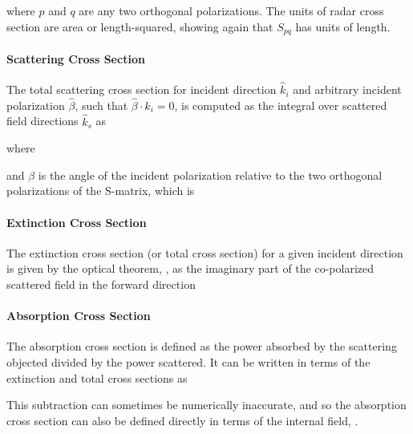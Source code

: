 \noindent where $p$ and $q$ are any two orthogonal polarizations. The units of radar cross section are area or length-squared, showing again that $S_{pq}$ has units of length.

\paragraph{Scattering Cross Section} The total scattering cross section for incident direction $\hat{k}_i$ and arbitrary incident polarization $\hat{\beta}$, such that $\hat{\beta} \cdot \hat{k}_i = 0$, is computed as the integral over scattered field directions $\hat{k}_s$ as

\noindent where

\noindent and $\beta$ is the angle of the incident polarization relative to the two orthogonal polarizations of the S-matrix, which is 

\paragraph{Extinction Cross Section} The extinction cross section (or total cross section) for a given incident direction is given by the optical theorem, \cite{zhang2019generalized}, as the imaginary part of the co-polarized scattered field in the forward direction

\paragraph{Absorption Cross Section} The absorption cross section is defined as the power absorbed by the scattering objected divided by the power scattered. It can be written in terms of the extinction and total cross sections as 

This subtraction can sometimes be numerically inaccurate, and so the absorption cross section can also be defined directly in terms of the internal field, \cite{yurkin2007discrete}.

